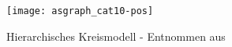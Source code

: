 \begin{figure}
  \begin{center}
  \texttt{[image: asgraph\_cat10-pos]}
  \caption{Hierarchisches Kreismodell - Entnommen aus~\cite{swbh-rsved-11}} \label{fig:asgraph_cat10}
  \end{center}
\end{figure}































